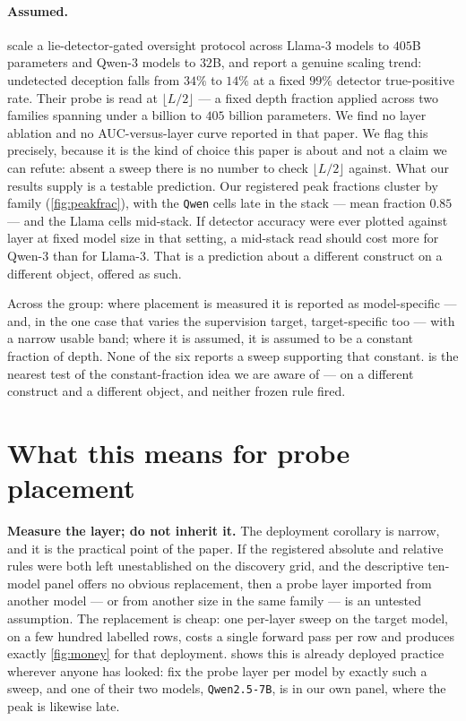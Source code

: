 \documentclass[10pt, letterpaper]{article}
\begin{document}
\paragraph{Assumed.} \citet{hollinsworth2026solid} scale a lie-detector-gated oversight protocol
across Llama-3 models to $405$B parameters and Qwen-3 models to $32$B, and report a genuine
scaling trend: undetected deception falls from $34\%$ to $14\%$ at a fixed $99\%$ detector
true-positive rate. Their probe is read at $\lfloor L/2 \rfloor$ --- a fixed depth fraction applied
across two families spanning under a billion to $405$ billion parameters. We find no layer
ablation and no AUC-versus-layer curve reported in that paper. We flag this precisely, because it is the kind of choice this
paper is about and not a claim we can refute: absent a sweep there is no number to check
$\lfloor L/2 \rfloor$ against. What our results supply is a testable prediction. Our registered
peak fractions cluster by family (\cref{fig:peakfrac}), with the \texttt{Qwen} cells late in the
stack --- mean fraction $0.85$ --- and the Llama cells mid-stack. If detector accuracy were ever
plotted against layer at fixed model size in that setting, a mid-stack read should cost more for
Qwen-3 than for Llama-3. That is a prediction about a different construct on a different object,
offered as such.

Across the group: where placement is measured it is reported as model-specific --- and, in the one
case that varies the supervision target, target-specific too --- with a narrow usable band; where
it is assumed, it is assumed to be a constant fraction of depth. None of the
six reports a sweep supporting that constant.  is the nearest test of the
constant-fraction idea we are aware of --- on a different construct and a different object, and
neither frozen rule fired.

\section{What this means for probe placement}
\label{sec:deployment}

\textbf{Measure the layer; do not inherit it.} The deployment corollary is
narrow, and it is the practical point of the paper. If the registered absolute and
relative rules were both left unestablished on the discovery grid, and the
descriptive ten-model panel offers no obvious replacement, then a probe layer
imported from another model --- or from another size in the same family --- is an
untested assumption. The
replacement is cheap: one per-layer sweep on the target model, on a few hundred
labelled rows, costs a single forward pass per row and produces exactly
\cref{fig:money} for that deployment.  shows this is already deployed
practice wherever anyone has looked: \citet{ruan2026abort} fix the probe layer per model by
exactly such a sweep, and one of their two models, \texttt{Qwen2.5-7B}, is in our own panel,
where the peak is likewise late.
\end{document}
